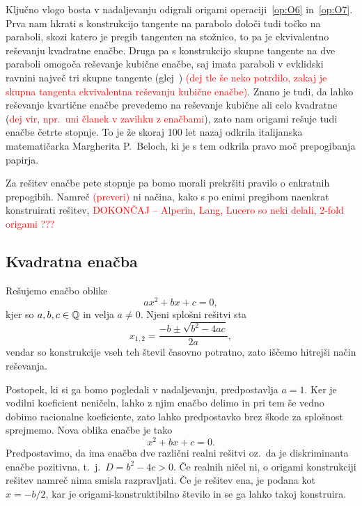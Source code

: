 Ključno vlogo bosta v nadaljevanju odigrali origami operaciji~\ref{op:O6} in~\ref{op:O7}. Prva nam hkrati s konstrukcijo tangente na parabolo določi tudi točko na paraboli, skozi katero je pregib tangenten na stožnico, to pa je ekvivalentno reševanju kvadratne enačbe. Druga pa s konstrukcijo skupne tangente na dve paraboli omogoča reševanje kubične enačbe, saj imata paraboli v evklidski ravnini največ tri skupne tangente (glej~\cite[str.\ 149--150]{geometricconstructions}) \textcolor{red}{(dej tle še neko potrdilo, zakaj je skupna tangenta ekvivalentna reševanju kubične enačbe)}. Znano je tudi, da lahko reševanje kvartične enačbe prevedemo na reševanje kubične ali celo kvadratne (\textcolor{red}{dej vir, npr.\ uni članek v zavihku z enačbami}), zato nam origami rešuje tudi enačbe četrte stopnje. To je že skoraj 100 let nazaj odkrila italijanska matematičarka Margherita P.\ Beloch, ki je s tem odkrila pravo moč prepogibanja papirja.

Za rešitev enačbe pete stopnje pa bomo morali prekršiti pravilo o enkratnih prepogibih. Namreč \textcolor{red}{(preveri)} ni načina, kako s po enimi pregibom naenkrat konstruirati rešitev, \textcolor{red}{DOKONČAJ -- Alperin, Lang, Lucero so neki delali, 2-fold origami ???}

\subsection{Kvadratna enačba}
\label{podpogl:kvadratna_enacba}

Rešujemo enačbo oblike
$$ a x^2 + b x + c = 0, $$
kjer so $a, b, c \in \mathbb Q$ in velja $a \neq 0$.  Njeni splošni rešitvi sta
$$ x_{1,2} = \frac{-b \pm \sqrt{b^2 - 4ac}}{2a},$$ vendar so konstrukcije vseh teh števil časovno potratno, zato iščemo hitrejši način reševanja.

Postopek, ki si ga bomo pogledali v nadaljevanju, predpostavlja $a = 1$. Ker je vodilni koeficient neničeln, lahko z njim enačbo delimo in pri tem še vedno dobimo racionalne koeficiente, zato lahko predpostavko brez škode za splošnost sprejmemo. Nova oblika enačbe je tako
\begin{equation}
    \label{eq:spl_kv_en}
    x^2 + bx + c = 0.
\end{equation}
Predpostavimo, da ima enačba dve različni realni rešitvi oz.\ da je diskriminanta enačbe pozitivna, t.\ j.\ $D = b^2 - 4c > 0$. Če realnih ničel ni, o origami konstrukciji rešitev namreč nima smisla razpravljati. Če je rešitev ena, je podana kot $x = -b/2$, kar je origami-konstruktibilno število in se ga lahko takoj konstruira.

